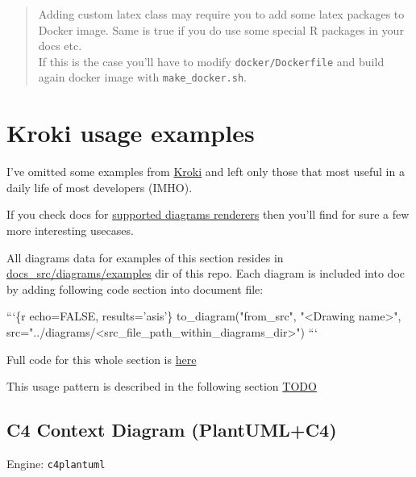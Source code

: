 \documentclass[12pt,a4paper,12pt,oneside,openany]{book}
\newenvironment{Shaded}{\begin{snugshade}}{\end{snugshade}}
\newcommand{\DataTypeTok}[1]{\textcolor[rgb]{0.27,0.27,0.27}{#1}}
\newcommand{\StringTok}[1]{\textcolor[rgb]{0.5,0.5,0.5}{#1}}
\begin{document}
\begin{quote}
Adding custom latex class may require you to add some latex packages to Docker image. Same is true if you do use some special R packages in your docs etc.\\
If this is the case you'll have to modify \texttt{docker/Dockerfile} and build again docker image with \texttt{make\_docker.sh}.
\end{quote}

\hypertarget{examplesKroki}{\chapter{Kroki usage examples}\label{examplesKroki}}

I've omitted some examples from \href{https://kroki.io/examples.html}{Kroki} and left only those that most useful in a daily life of most developers (IMHO).

If you check docs for \href{https://kroki.io/\#support}{supported diagrams renderers} then you'll find for sure a few more interesting usecases.

All diagrams data for examples of this section resides in \href{https://github.com/Godhart/devdoc-swissknife/tree/main/docs_src/diagrams/examples}{docs\_src/diagrams/examples} dir of this repo. Each diagram is included into doc by adding following code section into document file:

\begin{Shaded}
\begin{Highlighting}[]
\StringTok{```}\DataTypeTok{\{r echo=FALSE, results='asis'\}}
\DataTypeTok{  to_diagram("from_src", "<Drawing name>", src="../diagrams/<src_file_path_within_diagrams_dir>")}
\StringTok{```}
\end{Highlighting}
\end{Shaded}

Full code for this whole section is \href{https://github.com/Godhart/devdoc-swissknife/blob/main/docs_src/devdoc-swissknife-en/03-KrokiExamples.Rmd}{here}

This usage pattern is described in the following section \protect\hyperlink{TODO}{TODO}

\newpage

\section{C4 Context Diagram (PlantUML+C4)}\label{c4-context-diagram-plantumlc4}

Engine: \texttt{c4plantuml}
\end{document}
